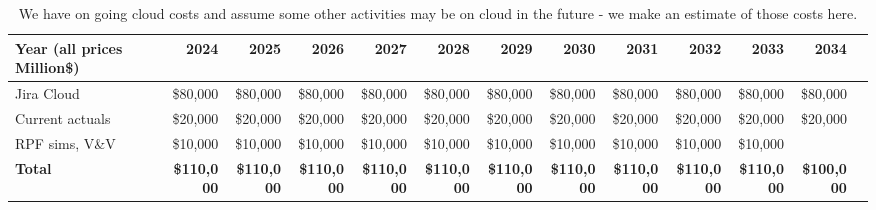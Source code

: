\tiny \begin{longtable} { |p{}  |r  |r  |r  |r  |r  |r  |r  |r  |r  |r  |r  |r |} 
\caption{We have on going cloud costs and assume some other activities may be on cloud in the future - we make an estimate of those costs here. \label{tab:cloud}}\\ 
\hline 
\textbf{Year  (all prices Million\$)}&\textbf{2024}&\textbf{2025}&\textbf{2026}&\textbf{2027}&\textbf{2028}&\textbf{2029}&\textbf{2030}&\textbf{2031}&\textbf{2032}&\textbf{2033}&\textbf{2034} \\ \hline
{Jira Cloud}&{\$80,000}&{\$80,000}&{\$80,000}&{\$80,000}&{\$80,000}&{\$80,000}&{\$80,000}&{\$80,000}&{\$80,000}&{\$80,000}&{\$80,000} \\ \hline
{Current actuals}&{\$20,000}&{\$20,000}&{\$20,000}&{\$20,000}&{\$20,000}&{\$20,000}&{\$20,000}&{\$20,000}&{\$20,000}&{\$20,000}&{\$20,000} \\ \hline
{RPF sims, V\&V}&{\$10,000}&{\$10,000}&{\$10,000}&{\$10,000}&{\$10,000}&{\$10,000}&{\$10,000}&{\$10,000}&{\$10,000}&{\$10,000}& \\ \hline
\textbf{Total}&\textbf{\$110,000}&\textbf{\$110,000}&\textbf{\$110,000}&\textbf{\$110,000}&\textbf{\$110,000}&\textbf{\$110,000}&\textbf{\$110,000}&\textbf{\$110,000}&\textbf{\$110,000}&\textbf{\$110,000}&\textbf{\$100,000} \\ \hline
\end{longtable} \normalsize
